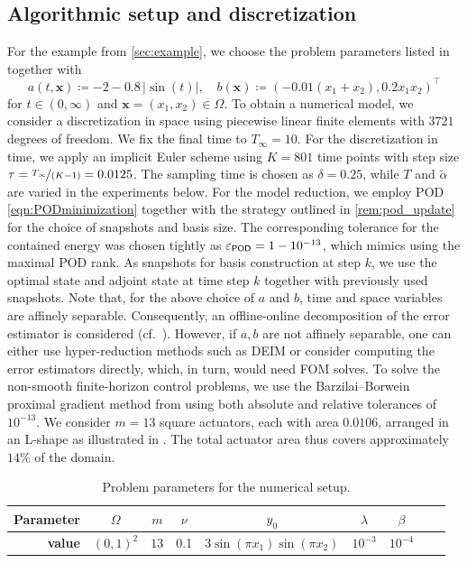 \documentclass{m2an}
\newcommand{\bx}{{\bm x}}
\begin{document}
\subsection{Algorithmic setup and discretization}\label{subsec:NUMEXP_setup}
%
For the example from \cref{sec:example}, we choose the problem parameters listed in  together with
%
\begin{equation*}
    a(t,\bx) \coloneqq -2-0.8\,|\sin(t)|,\quad  b(\bx)\coloneqq (-0.01(x_1+x_2),0.2x_1x_2)^\top
\end{equation*}
%
for $t\in(0,\infty)$ and $\bx=(x_1,x_2)\in\Omega$. To obtain a numerical model, we consider a discretization in space using piecewise linear finite elements with \( 3721 \) degrees of freedom. We fix the final time to \( T_\infty = 10 \). For the discretization in time, we apply an implicit Euler scheme using \( K = 801 \) time points with step size \( \tau = \nicefrac{T_\infty}{(K-1)} = 0.0125 \). The sampling time is chosen as \( \delta = {0.25} \), while \( T \) and \( \tilde \alpha \) are varied in the experiments below.
For the model reduction, we employ POD \eqref{eqn:PODminimization} {together with the strategy outlined in \cref{rem:pod_update} for the choice of snapshots and basis size. The corresponding tolerance for the contained energy was chosen tightly as \( \varepsilon_{\tiny \mathsf{POD}} = 1 - 10^{-13} \), which mimics using the maximal POD rank. As snapshots for basis construction at step $k$, we use the optimal state and adjoint state at time step $k$ together with previously used snapshots.} Note that, for the above choice of \( a \) and \( b \), time and space variables are affinely separable. Consequently, an offline-online decomposition of the error estimator is considered (cf.~\cite{hesthaven2016certified}). {However, if $a,b$ are not affinely separable, one can either use hyper-reduction methods such as DEIM or consider computing the error estimators directly, which, in turn, would need FOM solves.} To solve the non-smooth finite-horizon control problems, we use the Barzilai–Borwein proximal gradient method from \cite{azmi2025forward} using both absolute and relative tolerances of \( 10^{-13} \). We consider \( m = 13 \) square actuators, each with area \( 0.0106 \), arranged in an L-shape as illustrated in . The total actuator area thus covers approximately \( 14\% \) of the domain.
%
\begin{table}[ht!]
    \centering
    \caption{Problem parameters for the numerical setup.}
    \label{tab:parameters}
    \begin{tabular}{rcccccccc}
        \toprule
        \textbf{Parameter} &$\Omega$& $m$  & $\nu$ & $y_0$ & $\lambda$ & $\beta$ \\\midrule
        \textbf{value} & $(0,1)^2$& $13$ & 0.1 & $3\sin(\pi x_1)\sin(\pi x_2)$ & $10^{-3}$ & $10^{-4}$\\\bottomrule
    \end{tabular}
\end{table}
%
\end{document}
